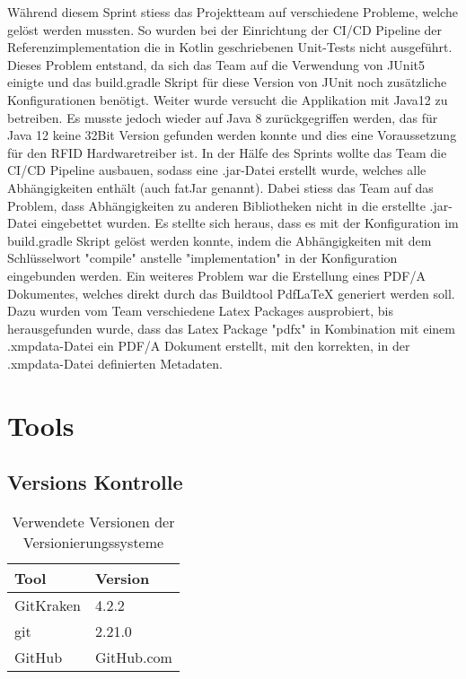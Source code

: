  Während diesem Sprint stiess das Projektteam auf verschiedene Probleme, welche gelöst werden mussten. So wurden bei der Einrichtung der CI/CD Pipeline der Referenzimplementation die in Kotlin geschriebenen Unit-Tests nicht ausgeführt. Dieses Problem entstand, da sich das Team auf die Verwendung von JUnit5 einigte und das build.gradle Skript für diese Version von JUnit noch zusätzliche Konfigurationen benötigt. Weiter wurde versucht die Applikation mit Java12 zu betreiben. Es musste jedoch wieder auf Java 8 zurückgegriffen werden, das für Java 12 keine 32Bit Version gefunden werden konnte und dies eine Voraussetzung für den RFID Hardwaretreiber ist. In der Hälfe des Sprints wollte das Team die CI/CD Pipeline ausbauen, sodass eine .jar-Datei erstellt wurde, welches alle Abhängigkeiten enthält (auch fatJar genannt). Dabei stiess das Team auf das Problem, dass Abhängigkeiten zu anderen Bibliotheken nicht in die erstellte .jar-Datei eingebettet wurden. Es stellte sich heraus, dass es mit der Konfiguration im build.gradle Skript gelöst werden konnte, indem die Abhängigkeiten mit dem Schlüsselwort "compile" anstelle "implementation" in der Konfiguration eingebunden werden. Ein weiteres Problem war die Erstellung eines PDF/A Dokumentes, welches direkt durch das Buildtool PdfLaTeX generiert werden soll. Dazu wurden vom Team verschiedene Latex Packages ausprobiert, bis herausgefunden wurde, dass das Latex Package "pdfx" in Kombination mit einem .xmpdata-Datei ein PDF/A Dokument erstellt, mit den korrekten, in der .xmpdata-Datei definierten Metadaten.

\newpage

\section{Tools}
\label{sec:Tools}

\subsection{Versions Kontrolle}
\begin{table}[h!]
	\begin{tabular}{p{} p{}}
		\hline
		\textbf{Tool} & \textbf{Version} \\
		\hline
		GitKraken & 4.2.2 \\
		\hline
		git & 2.21.0 \\
		\hline
		GitHub & GitHub.com \\
		\hline
	\end{tabular}
	\caption{Verwendete Versionen der Versionierungssysteme}
\end{table}

